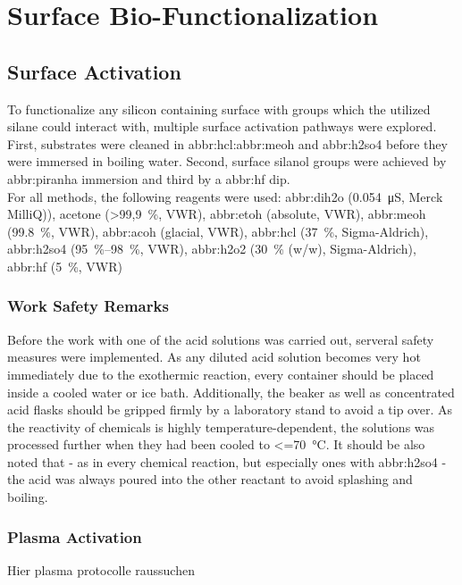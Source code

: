 \section{Surface Bio-Functionalization}

\subsection{Surface Activation}
To functionalize any silicon containing surface with  groups which the utilized silane could interact with, multiple surface activation pathways were explored. First, substrates were cleaned in \gls{abbr:hcl}:\gls{abbr:meoh} and \gls{abbr:h2so4} before they were immersed in boiling water. Second, surface silanol groups were achieved by \gls{abbr:piranha} immersion and third by a \gls{abbr:hf} dip.\\
For all methods, the following reagents were used: \gls{abbr:dih2o} (\SI{0,054}{\micro\siemens}, Merck MilliQ)), acetone (\SI{>99,9}{\percent}, VWR), \gls{abbr:etoh} (absolute, VWR), \gls{abbr:meoh} (\SI{99.8}{\percent}, VWR), \gls{abbr:acoh} (glacial, VWR), \gls{abbr:hcl} (\SI{37}{\percent}, Sigma-Aldrich), \gls{abbr:h2so4} (\SIrange{95}{98}{\percent}, VWR), \gls{abbr:h2o2} (\SI{30}{\percent} (w/w), Sigma-Aldrich), \gls{abbr:hf} (\SI{5}{\percent}, VWR)

\subsubsection{Work Safety Remarks}
Before the work with one of the acid solutions was carried out, serveral safety measures were implemented. As any diluted acid solution becomes very hot immediately due to the exothermic reaction, every container should be placed inside a cooled water or ice bath. Additionally, the beaker as well as concentrated acid flasks should be gripped firmly by a laboratory stand to avoid a tip over. As the reactivity of chemicals is highly temperature-dependent, the solutions was processed further when they had been cooled to \SI{<=70}{\degreeCelsius}. It should be also noted that - as in every chemical reaction, but especially ones with \gls{abbr:h2so4} - the acid was always poured into the other reactant to avoid splashing and boiling.

\subsubsection{Plasma Activation}

Hier plasma protocolle raussuchen

